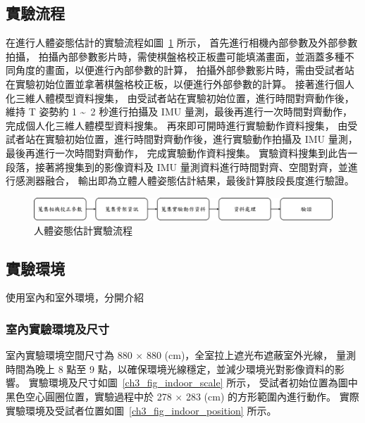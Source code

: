 \subsection{實驗流程}
在進行人體姿態估計的實驗流程如圖~\ref{ch3_fig_exp_flow} 所示，
首先進行相機內部參數及外部參數拍攝，
拍攝內部參數影片時，需使棋盤格校正板盡可能填滿畫面，並涵蓋多種不同角度的畫面，以便進行內部參數的計算，
拍攝外部參數影片時，需由受試者站在實驗初始位置並拿著棋盤格校正板，以便進行外部參數的計算。
接著進行個人化三維人體模型資料搜集，
由受試者站在實驗初始位置，進行時間對齊動作後，維持 T 姿勢約 1 \textasciitilde\ 2 秒進行拍攝及 IMU 量測，最後再進行一次時間對齊動作，
完成個人化三維人體模型資料搜集。
再來即可開時進行實驗動作資料搜集，
由受試者站在實驗初始位置，進行時間對齊動作後，進行實驗動作拍攝及 IMU 量測，最後再進行一次時間對齊動作，
完成實驗動作資料搜集。
實驗資料搜集到此告一段落，接著將搜集到的影像資料及 IMU 量測資料進行時間對齊、空間對齊，並進行感測器融合，
輸出即為立體人體姿態估計結果，最後計算肢段長度進行驗證。

\begin{figure}[!ht]
   \centering
   \includegraphics[width=\linewidth]{figure/ch3_fig_exp_flow.png}
    \caption[人體姿態估計實驗流程]{人體姿態估計實驗流程}
    \label{ch3_fig_exp_flow}
\end{figure}

\subsection{實驗環境}
使用室內和室外環境，分開介紹

\subsubsection{室內實驗環境及尺寸}
室內實驗環境空間尺寸為 880 $\times$ 880 (cm)，全室拉上遮光布遮蔽室外光線，
量測時間為晚上 8 點至 9 點，以確保環境光線穩定，並減少環境光對影像資料的影響。
實驗環境及尺寸如圖~\ref{ch3_fig_indoor_scale} 所示，
受試者初始位置為圖中黑色空心圓圈位置，實驗過程中於 278 $\times$ 283 (cm) 的方形範圍內進行動作。
實際實驗環境及受試者位置如圖~\ref{ch3_fig_indoor_position} 所示。

